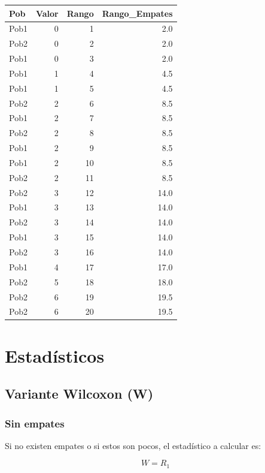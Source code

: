 \documentclass[]{book}
\theoremstyle{definition}
\theoremstyle{definition}
\theoremstyle{definition}
\theoremstyle{remark}
\begin{document}
\begin{tabular}{l|r|r|r}
\hline
Pob & Valor & Rango & Rango\_Empates\\
\hline
Pob1 & 0 & 1 & 2.0\\
\hline
Pob2 & 0 & 2 & 2.0\\
\hline
Pob1 & 0 & 3 & 2.0\\
\hline
Pob1 & 1 & 4 & 4.5\\
\hline
Pob1 & 1 & 5 & 4.5\\
\hline
Pob2 & 2 & 6 & 8.5\\
\hline
Pob1 & 2 & 7 & 8.5\\
\hline
Pob2 & 2 & 8 & 8.5\\
\hline
Pob1 & 2 & 9 & 8.5\\
\hline
Pob1 & 2 & 10 & 8.5\\
\hline
Pob2 & 2 & 11 & 8.5\\
\hline
Pob2 & 3 & 12 & 14.0\\
\hline
Pob1 & 3 & 13 & 14.0\\
\hline
Pob2 & 3 & 14 & 14.0\\
\hline
Pob1 & 3 & 15 & 14.0\\
\hline
Pob2 & 3 & 16 & 14.0\\
\hline
Pob1 & 4 & 17 & 17.0\\
\hline
Pob2 & 5 & 18 & 18.0\\
\hline
Pob2 & 6 & 19 & 19.5\\
\hline
Pob2 & 6 & 20 & 19.5\\
\hline
\end{tabular}

\hypertarget{estadisticos}{%
\section{Estadísticos}\label{estadisticos}}

\hypertarget{variante-wilcoxon-w}{%
\subsection{Variante Wilcoxon (W)}\label{variante-wilcoxon-w}}

\hypertarget{sin-empates}{%
\subsubsection{Sin empates}\label{sin-empates}}

Si no existen empates o si estos son pocos, el estadístico a calcular
es:

\[W=R_1\]
\end{document}
